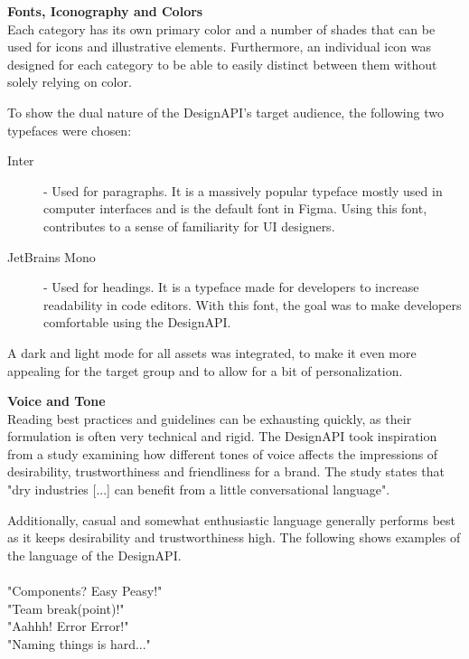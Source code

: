 \textbf{Fonts, Iconography and Colors}\\
Each category has its own primary color and a number of shades that can be used for icons and
illustrative elements. Furthermore, an individual icon was designed for each category to be able to
easily distinct between them without solely relying on color.

To show the dual nature of the DesignAPI's target audience, the following two typefaces were chosen:
\begin{description}
    \item[Inter] - Used for paragraphs. It is a massively popular typeface mostly used in
          computer interfaces and is the default font in Figma. Using this font, contributes to a sense of
          familiarity for UI designers. 

    \item[JetBrains Mono] - Used for headings. It is a typeface made for developers to increase
          readability in code editors. With this font, the goal was to make developers comfortable using
          the DesignAPI. 
\end{description}

A dark and light mode for all assets was integrated, to make it even more appealing for the target
group and to allow for a bit of personalization.

\textbf{Voice and Tone}\\
Reading best practices and guidelines can be exhausting quickly, as their formulation is often very
technical and rigid. The DesignAPI took inspiration from a study examining how different tones of
voice affects the impressions of desirability, trustworthiness and friendliness for a brand. 
The study states that "dry industries [...] can benefit from a little conversational language".

Additionally, casual and somewhat enthusiastic language generally performs best as it keeps
desirability and trustworthiness high. 
The following shows examples of the language of the DesignAPI.\\\\
"Components? Easy Peasy!"\\
"Team break(point)!"\\
"Aahhh! Error Error!"\\
"Naming things is hard..."\\
